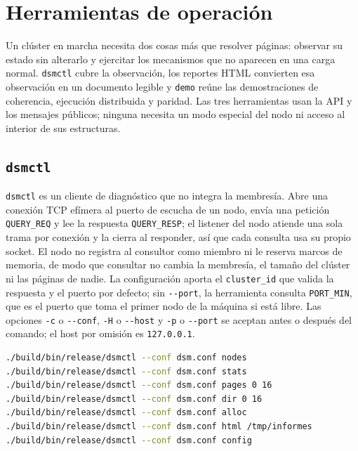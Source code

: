 \section{Herramientas de operación}\label{sec:herramientas}

Un clúster en marcha necesita dos cosas más que resolver páginas: observar su estado sin alterarlo y ejercitar los mecanismos que no aparecen en una carga normal. \texttt{dsmctl} cubre la observación, los reportes HTML convierten esa observación en un documento legible y \texttt{demo} reúne las demostraciones de coherencia, ejecución distribuida y paridad. Las tres herramientas usan la API y los mensajes públicos; ninguna necesita un modo especial del nodo ni acceso al interior de sus estructuras.

\subsection{\texttt{dsmctl}}\label{sec:dsmctl}

\texttt{dsmctl} es un cliente de diagnóstico que no integra la membresía. Abre una conexión TCP efímera al puerto de escucha de un nodo, envía una petición \texttt{QUERY\_REQ} y lee la respuesta \texttt{QUERY\_RESP}; el listener del nodo atiende una sola trama por conexión y la cierra al responder, así que cada consulta usa su propio socket. El nodo no registra al consultor como miembro ni le reserva marcos de memoria, de modo que consultar no cambia la membresía, el tamaño del clúster ni las páginas de nadie. La configuración aporta el \texttt{cluster\_id} que valida la respuesta y el puerto por defecto; sin \texttt{-{}-port}, la herramienta consulta \texttt{PORT\_MIN}, que es el puerto que toma el primer nodo de la máquina si está libre. Las opciones \texttt{-c} o \texttt{-{}-conf}, \texttt{-H} o \texttt{-{}-host} y \texttt{-p} o \texttt{-{}-port} se aceptan antes o después del comando; el host por omisión es \texttt{127.0.0.1}.

\begin{lstlisting}[language=bash, caption={Consultas de \texttt{dsmctl} sobre un clúster en marcha.}, label={lst:dsmctl}]
./build/bin/release/dsmctl --conf dsm.conf nodes
./build/bin/release/dsmctl --conf dsm.conf stats
./build/bin/release/dsmctl --conf dsm.conf pages 0 16
./build/bin/release/dsmctl --conf dsm.conf dir 0 16
./build/bin/release/dsmctl --conf dsm.conf alloc
./build/bin/release/dsmctl --conf dsm.conf html /tmp/informes
./build/bin/release/dsmctl --conf dsm.conf config
\end{lstlisting}

